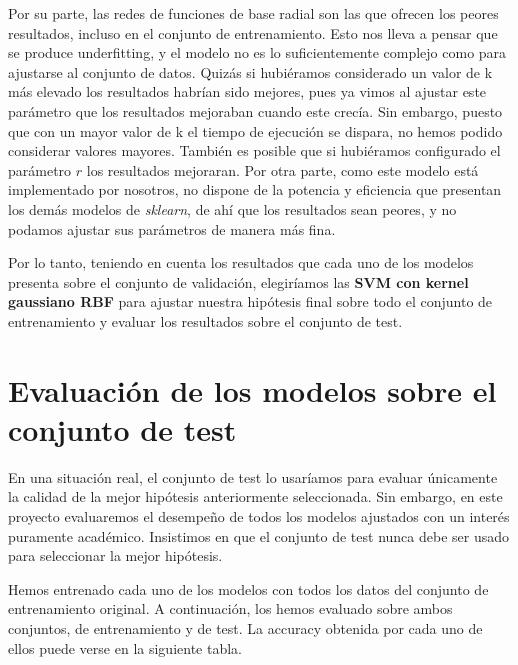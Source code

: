 \documentclass[a4]{article}
\begin{document}
Por su parte, las redes de funciones de base radial son las que ofrecen los peores resultados, 
incluso en el conjunto de entrenamiento. Esto nos lleva a pensar que se produce underfitting, y el modelo no es lo suficientemente complejo como para ajustarse al conjunto de datos. Quizás si hubiéramos considerado un valor de k más elevado los resultados habrían sido mejores, pues ya vimos al ajustar este parámetro que los resultados mejoraban cuando este crecía. Sin embargo, puesto que con un mayor valor de k el tiempo de ejecución se dispara, no hemos podido considerar valores mayores. También es posible que si hubiéramos configurado el parámetro $r$ los resultados mejoraran. 
Por otra parte, como este modelo está implementado por nosotros, no dispone de la potencia y eficiencia que presentan los demás modelos de \textit{sklearn}, de ahí que los resultados sean peores, y no podamos ajustar sus parámetros de manera más fina. 

Por lo tanto, teniendo en cuenta los resultados que cada uno de los modelos presenta sobre el conjunto de validación, elegiríamos las \textbf{SVM con kernel gaussiano RBF} para ajustar nuestra hipótesis final sobre todo el conjunto de entrenamiento y evaluar los resultados sobre el conjunto de test. 

\section{Evaluación de los modelos sobre el conjunto de test}

En una situación real, el conjunto de test lo usaríamos para evaluar únicamente la calidad de la mejor hipótesis anteriormente seleccionada. Sin embargo, en este proyecto evaluaremos el desempeño de todos los modelos ajustados con un interés puramente académico. Insistimos en que el conjunto de test nunca debe ser usado para seleccionar la mejor hipótesis.

Hemos entrenado cada uno de los modelos con todos los datos del conjunto de entrenamiento original. A continuación, los hemos evaluado sobre ambos conjuntos, de entrenamiento y de test. La accuracy obtenida por cada uno de ellos puede verse en la siguiente tabla.
\end{document}
